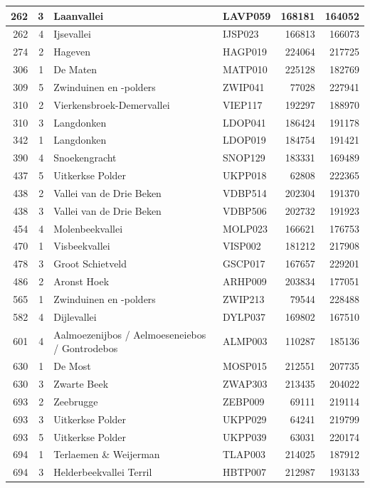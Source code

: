 \documentclass[11pt,]{book}
\begin{document}
\begin{table}
\begin{tabular}[t]{r|r|l|l|r|r}
\hline
262 & 3 & Laanvallei & LAVP059 & 168181 & 164052\\
\hline
262 & 4 & Ijsevallei & IJSP023 & 166813 & 166073\\
\hline
274 & 2 & Hageven & HAGP019 & 224064 & 217725\\
\hline
306 & 1 & De Maten & MATP010 & 225128 & 182769\\
\hline
309 & 5 & Zwinduinen en -polders & ZWIP041 & 77028 & 227941\\
\hline
310 & 2 & Vierkensbroek-Demervallei & VIEP117 & 192297 & 188970\\
\hline
310 & 3 & Langdonken & LDOP041 & 186424 & 191178\\
\hline
342 & 1 & Langdonken & LDOP019 & 184754 & 191421\\
\hline
390 & 4 & Snoekengracht & SNOP129 & 183331 & 169489\\
\hline
437 & 5 & Uitkerkse Polder & UKPP018 & 62808 & 222365\\
\hline
438 & 2 & Vallei van de Drie Beken & VDBP514 & 202304 & 191370\\
\hline
438 & 3 & Vallei van de Drie Beken & VDBP506 & 202732 & 191923\\
\hline
454 & 4 & Molenbeekvallei & MOLP023 & 166621 & 176753\\
\hline
470 & 1 & Visbeekvallei & VISP002 & 181212 & 217908\\
\hline
478 & 3 & Groot Schietveld & GSCP017 & 167657 & 229201\\
\hline
486 & 2 & Aronst Hoek & ARHP009 & 203834 & 177051\\
\hline
565 & 1 & Zwinduinen en -polders & ZWIP213 & 79544 & 228488\\
\hline
582 & 4 & Dijlevallei & DYLP037 & 169802 & 167510\\
\hline
601 & 4 & Aalmoezenijbos / Aelmoeseneiebos / Gontrodebos & ALMP003 & 110287 & 185136\\
\hline
630 & 1 & De Most & MOSP015 & 212551 & 207735\\
\hline
630 & 3 & Zwarte Beek & ZWAP303 & 213435 & 204022\\
\hline
693 & 2 & Zeebrugge & ZEBP009 & 69111 & 219114\\
\hline
693 & 3 & Uitkerkse Polder & UKPP029 & 64241 & 219799\\
\hline
693 & 5 & Uitkerkse Polder & UKPP039 & 63031 & 220174\\
\hline
694 & 1 & Terlaemen \& Weijerman & TLAP003 & 214025 & 187912\\
\hline
694 & 3 & Helderbeekvallei Terril & HBTP007 & 212987 & 193133\\

\end{tabular}
\end{table}
\end{document}

